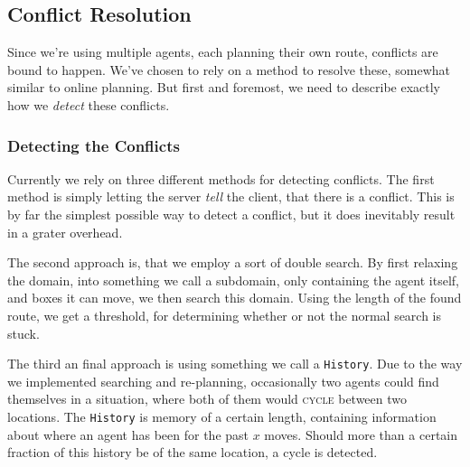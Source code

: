 \documentclass[letterpaper]{article}
\begin{document}
	\subsection{Conflict Resolution}
		Since we're using multiple agents, each planning their own route, conflicts are bound to happen. We've chosen to rely on a method to resolve these, somewhat similar to online planning. But first and foremost, we need to describe exactly how we \emph{detect} these conflicts.

		\subsubsection{Detecting the Conflicts}
			Currently we rely on three different methods for detecting conflicts. The first method is simply letting the server \emph{tell} the client, that there is a conflict. This is by far the simplest possible way to detect a conflict, but it does inevitably result in a grater overhead. 

			The second approach is, that we employ a sort of double search. By first relaxing the domain, into something we call a subdomain, only containing the agent itself, and boxes it can move, we then search this domain. Using the length of the found route, we get a threshold, for determining whether or not the normal search is stuck.



			The third an final approach is using something we call a \verb=History=. Due to the way we implemented searching and re-planning, occasionally two agents could find themselves in a situation, where both of them would \textsc{cycle} between two locations. The \verb=History= is memory of a certain length, containing information about where an agent has been for the past $x$ moves. Should more than a certain fraction of this history be of the same location, a cycle is detected.
\end{document}
